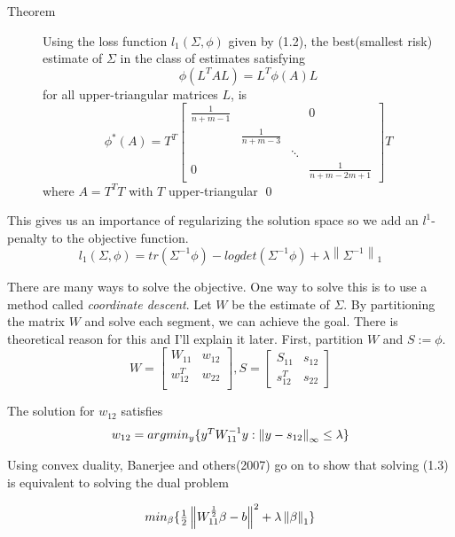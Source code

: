 \documentclass[openany]{memoir}
\begin{document}
 \begin{description}
 \item[Theorem] Using the loss function $l_1(\Sigma, \phi)$ given by (1.2), the best(smallest risk) estimate of $\Sigma$ in the class of estimates satisfying
 $$\phi(L^TAL) = L^T\phi(A)L$$
 for all upper-triangular matrices $L$, is
 $$\phi^*(A) = T^T\begin{bmatrix}
	 \frac{1}{n + m - 1} & & & 0 \\
	  & \frac{1}{n + m - 3} & & \\
	   & & \ddots & \\
	  0 & & & \frac{1}{n + m - 2m + 1} 
\end{bmatrix}T$$ 
where $A=T^TT$ with $T$ upper-triangular \qed
 \end{description}
 
This gives us an importance of regularizing the solution space so we add an $l^1$-penalty to the objective function.
 $$l_1(\Sigma, \phi) = tr(\Sigma^{-1}\phi) - logdet(\Sigma^{-1} \phi) + \lambda \left\|\Sigma^{-1}\right\|_1$$

There are many ways to solve the objective. One way to solve this is to use a method called \textit{coordinate descent}. Let $W$ be the estimate of $\Sigma$. By partitioning the matrix $W$ and solve each segment, we can achieve the goal. There is theoretical reason for this and I'll explain it later. First, partition $W$ and $S := \phi$.
$$W = \begin{bmatrix}
W_{11} & w_{12} \\
w_{12}^T & w_{22}\\
\end{bmatrix}, S = \begin{bmatrix}
S_{11} & s_{12} \\
s_{12}^{T} & s_22
\end{bmatrix}$$

The solution for $w_{12}$ satisfies
\begin{equation}
\begin{gathered}
$$w_{12} = argmin_{y} \{y^TW_{11}^{-1} y : \left\|y - s_{12}\right\|_{\infty} \leq \lambda\}$$
\end{gathered}
\end{equation}

Using convex duality, Banerjee and others(2007) go on to show that solving (1.3) is equivalent to solving the dual problem

\begin{equation}
\begin{gathered}
$$min_{\beta}\{\frac{1}{2}\left\|W_{11}^{\frac{1}{2}}\beta - b\right\|^2 + \lambda \left\|\beta\right\|_{1}\}$$
\end{gathered}
\end{equation}
\end{document}
